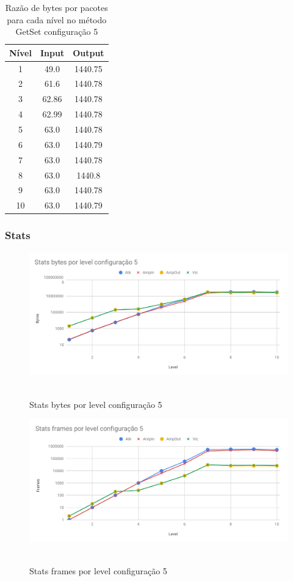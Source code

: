 \begin{table}[H]
\centering
\label{tab:bytespacsGetSet5}
\caption{Razão de bytes por pacotes para cada nível no método GetSet configuração 5}
\begin{tabular}{|c|c|c|}
\hline
Nível & Input & Output  \\ \hline
1     & 49.0  & 1440.75 \\ \hline
2     & 61.6  & 1440.78 \\ \hline
3     & 62.86 & 1440.78 \\ \hline
4     & 62.99 & 1440.78 \\ \hline
5     & 63.0  & 1440.78 \\ \hline
6     & 63.0  & 1440.79 \\ \hline
7     & 63.0  & 1440.78 \\ \hline
8     & 63.0  & 1440.8  \\ \hline
9     & 63.0  & 1440.78 \\ \hline
10    & 63.0  & 1440.79 \\ \hline
\end{tabular}
\end{table}

\subsubsection{Stats}

\begin{figure}[H]
     \centering
     \label{graf:StatsBytes5}
     \includegraphics[scale=0.6]{img/capturas/StatsBLC5.pdf}\
     \caption{Stats bytes por level configuração 5}
\end{figure}

\begin{figure}[H]
     \centering
     \label{graf:StatsFrames5}
     \includegraphics[scale=0.6]{img/capturas/StatsFLC5.pdf}\
     \caption{Stats frames por level configuração 5}
\end{figure}

